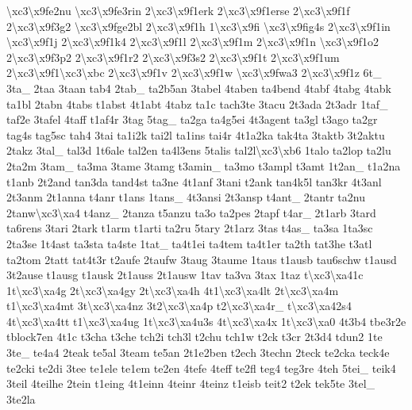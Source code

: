 {\textbackslash{}xc3\textbackslash{}x9fe2nu \textbackslash{}xc3\textbackslash{}x9fe3rin 2\textbackslash{}xc3\textbackslash{}x9f1erk 2\textbackslash{}xc3\textbackslash{}x9f1erse 2\textbackslash{}xc3\textbackslash{}x9f1f 2\textbackslash{}xc3\textbackslash{}x9f3g2 \textbackslash{}xc3\textbackslash{}x9fge2bl 2\textbackslash{}xc3\textbackslash{}x9f1h 1\textbackslash{}xc3\textbackslash{}x9fi \textbackslash{}xc3\textbackslash{}x9fig4s 2\textbackslash{}xc3\textbackslash{}x9f1in \textbackslash{}xc3\textbackslash{}x9f1j 2\textbackslash{}xc3\textbackslash{}x9f1k4 2\textbackslash{}xc3\textbackslash{}x9f1l 2\textbackslash{}xc3\textbackslash{}x9f1m 2\textbackslash{}xc3\textbackslash{}x9f1n \textbackslash{}xc3\textbackslash{}x9f1o2 2\textbackslash{}xc3\textbackslash{}x9f3p2 2\textbackslash{}xc3\textbackslash{}x9f1r2 2\textbackslash{}xc3\textbackslash{}x9f3s2 2\textbackslash{}xc3\textbackslash{}x9f1t 2\textbackslash{}xc3\textbackslash{}x9f1um 2\textbackslash{}xc3\textbackslash{}x9f1\textbackslash{}xc3\textbackslash{}xbc 2\textbackslash{}xc3\textbackslash{}x9f1v 2\textbackslash{}xc3\textbackslash{}x9f1w \textbackslash{}xc3\textbackslash{}x9fwa3 2\textbackslash{}xc3\textbackslash{}x9f1z 6t\-\_\- 3ta\-\_\- 2taa 3taan tab4 2tab\-\_\- ta2b5an 3tabel 4taben ta4bend 4tabf 4tabg 4tabk ta1bl 2tabn 4tabs t1abst 4t1abt 4tabz ta1c tach3te 3tacu 2t3ada 2t3adr 1taf\-\_\- taf2e 3tafel 4taff t1af4r 3tag 5tag\-\_\- ta2ga ta4g5ei 4t3agent ta3gl t3ago ta2gr tag4s tag5sc tah4 3tai ta1i2k tai2l ta1ins tai4r 4t1a2ka tak4ta 3taktb 3t2aktu 2takz 3tal\-\_\- tal3d 1t6ale tal2en ta4l3ens 5talis tal2l\textbackslash{}xc3\textbackslash{}xb6 1talo ta2lop ta2lu 2ta2m 3tam\-\_\- ta3ma 3tame 3tamg t3amin\-\_\- ta3mo t3ampl t3amt 1t2an\-\_\- t1a2na t1anb 2t2and tan3da tand4st ta3ne 4t1anf 3tani t2ank tan4k5l tan3kr 4t3anl 2t3anm 2t1anna t4anr t1ans 1tans\-\_\- 4t3ansi 2t3ansp t4ant\-\_\- 2tantr ta2nu 2tanw\textbackslash{}xc3\textbackslash{}xa4 t4anz\-\_\- 2tanza t5anzu ta3o ta2pes 2tapf t4ar\-\_\- 2t1arb 3tard ta6rens 3tari 2tark t1arm t1arti ta2ru 5tary 2t1arz 3tas t4as\-\_\- ta3sa 1ta3sc 2ta3se 1t4ast ta3sta ta4ste 1tat\-\_\- ta4t1ei ta4tem ta4t1er ta2th tat3he t3atl ta2tom 2tatt tat4t3r t2aufe 2taufw 3taug 3taume 1taus t1ausb tau6schw t1ausd 3t2ause t1ausg t1ausk 2t1auss 2t1ausw 1tav ta3va 3tax 1taz t\textbackslash{}xc3\textbackslash{}xa41c 1t\textbackslash{}xc3\textbackslash{}xa4g 2t\textbackslash{}xc3\textbackslash{}xa4gy 2t\textbackslash{}xc3\textbackslash{}xa4h 4t1\textbackslash{}xc3\textbackslash{}xa4lt 2t\textbackslash{}xc3\textbackslash{}xa4m t1\textbackslash{}xc3\textbackslash{}xa4mt 3t\textbackslash{}xc3\textbackslash{}xa4nz 3t2\textbackslash{}xc3\textbackslash{}xa4p t2\textbackslash{}xc3\textbackslash{}xa4r\-\_\- t\textbackslash{}xc3\textbackslash{}xa42s4 4t\textbackslash{}xc3\textbackslash{}xa4tt t1\textbackslash{}xc3\textbackslash{}xa4ug 1t\textbackslash{}xc3\textbackslash{}xa4u3s 4t\textbackslash{}xc3\textbackslash{}xa4x 1t\textbackslash{}xc3\textbackslash{}xa0 4t3b4 tbe3r2e tblock7en 4t1c t3cha t3che tch2i tch3l t2chu tch1w t2ck t3cr 2t3d4 tdun2 1te 3te\-\_\- te4a4 2teak te5al 3team te5an 2t1e2ben t2ech 3techn 2teck te2cka teck4e te2cki te2di 3tee te1ele te1em te2en 4tefe 4teff te2fl teg4 teg3re 4teh 5tei\-\_\- teik4 3teil 4teilhe 2tein t1eing 4t1einn 4teinr 4teinz t1eisb teit2 t2ek tek5te 3tel\-\_\- 3te2la }
